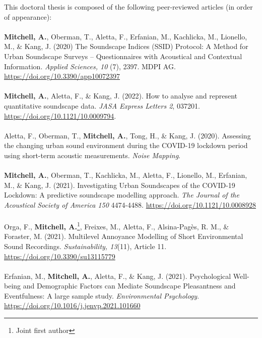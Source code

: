 \documentclass[oneside,fontsize=11pt,titlepage,chapterprefix=true
]{scrbook}
\begin{document}
This doctoral thesis is composed of the following peer-reviewed articles (in order of appearance):

\paragraph*{}
\textbf{Mitchell, A.}, Oberman, T., Aletta, F., Erfanian, M., Kachlicka, M., Lionello, M., \& Kang, J. (2020) The Soundscape Indices (SSID) Protocol: A Method for Urban Soundscape Surveys -- Questionnaires with Acoustical and Contextual Information. \emph{Applied Sciences, 10} (7), 2397. MDPI AG. \url{https://doi.org/10.3390/app10072397}

\paragraph*{}
\textbf{Mitchell, A.}, Aletta, F., \& Kang, J. (2022). How to analyse and represent quantitative soundscape data. \emph{JASA Express Letters 2}, 037201. \url{https://doi.org/10.1121/10.0009794}.


\paragraph*{}
Aletta, F., Oberman, T., \textbf{Mitchell, A.}, Tong, H., \& Kang, J. (2020). Assessing the changing urban sound environment during the COVID-19 lockdown period using short-term acoustic measurements. \emph{Noise Mapping}.

\paragraph*{}
\textbf{Mitchell, A.}, Oberman, T., Kachlicka, M., Aletta, F., Lionello, M., Erfanian, M., \& Kang, J. (2021). Investigating Urban Soundscapes of the COVID-19 Lockdown: A predictive soundscape modelling approach. \emph{The Journal of the Acoustical Society of America 150} 4474-4488. \url{https://doi.org/10.1121/10.0008928}

\paragraph*{}
Orga, F., \textbf{Mitchell, A.}\footnote{Joint first author}, Freixes, M., Aletta, F., Alsina-Pagès, R. M., \& Foraster, M. (2021). Multilevel Annoyance Modelling of Short Environmental Sound Recordings. \emph{Sustainability, 13}(11), Article 11. \url{https://doi.org/10.3390/su13115779}

\paragraph*{}
Erfanian, M., \textbf{Mitchell, A.}, Aletta, F., \& Kang, J. (2021). Psychological Well-being and Demographic Factors can Mediate Soundscape Pleasantness and Eventfulness: A large sample study. \emph{Environmental Psychology}. \url{https://doi.org/10.1016/j.jenvp.2021.101660}
\end{document}

